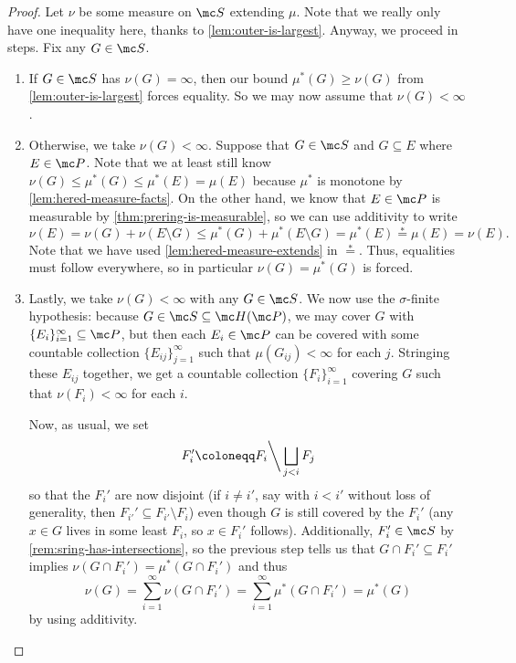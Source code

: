 \documentclass[../notes.tex]{subfiles}
\begin{document}
\begin{proof}
	Let $\nu$ be some measure on $\mc S$ extending $\mu$. Note that we really only have one inequality here, thanks to \autoref{lem:outer-is-largest}. Anyway, we proceed in steps. Fix any $G\in\mc S$.
	\begin{enumerate}
		\item If $G\in\mc S$ has $\nu(G)=\infty$, then our bound $\mu^*(G)\ge\nu(G)$ from \autoref{lem:outer-is-largest} forces equality. So we may now assume that $\nu(G)<\infty$.
		\item Otherwise, we take $\nu(G)<\infty$. Suppose that $G\in\mc S$ and $G\subseteq E$ where $E\in\mc P$. Note that we at least still know $\nu(G)\le\mu^*(G)\le\mu^*(E)=\mu(E)$ because $\mu^*$ is monotone by \autoref{lem:hered-measure-facts}. On the other hand, we know that $E\in\mc P$ is measurable by \autoref{thm:prering-is-measurable}, so we can use additivity to write
		\[\nu(E)=\nu(G)+\nu(E\setminus G)\le\mu^*(G)+\mu^*(E\setminus G)=\mu^*(E)\stackrel*=\mu(E)=\nu(E).\]
		Note that we have used \autoref{lem:hered-measure-extends} in $\stackrel*=$. Thus, equalities must follow everywhere, so in particular $\nu(G)=\mu^*(G)$ is forced.
		\item Lastly, we take $\nu(G)<\infty$ with any $G\in\mc S$. We now use the $\sigma$-finite hypothesis: because $G\in\mc S\subseteq\mc H(\mc P)$, we may cover $G$ with $\{E_i\}_{i=1}^\infty\subseteq\mc P$, but then each $E_i\in\mc P$ can be covered with some countable collection $\{E_{ij}\}_{j=1}^\infty$ such that $\mu(G_{ij})<\infty$ for each $j$. Stringing these $E_{ij}$ together, we get a countable collection $\{F_i\}_{i=1}^\infty$ covering $G$ such that $\nu(F_i)<\infty$ for each $i$.

		Now, as usual, we set
		\[F_i'\coloneqq F_i{\mathbin\bigg\backslash}\bigsqcup_{j<i}F_j\]
		so that the $F_i'$ are now disjoint (if $i\ne i'$, say with $i<i'$ without loss of generality, then $F_{i'}'\subseteq F_{i'}\setminus F_i$) even though $G$ is still covered by the $F_i'$ (any $x\in G$ lives in some least $F_i$, so $x\in F_i'$ follows). Additionally, $F_i'\in\mc S$ by \autoref{rem:sring-has-intersections}, so the previous step tells us that $G\cap F_i'\subseteq F_i'$ implies $\nu(G\cap F_i')=\mu^*(G\cap F_i')$ and thus
		\[\nu(G)=\sum_{i=1}^\infty\nu(G\cap F_i')=\sum_{i=1}^\infty\mu^*(G\cap F_i')=\mu^*(G)\]
		by using additivity.
		\qedhere
	\end{enumerate}
\end{proof}
\end{document}
